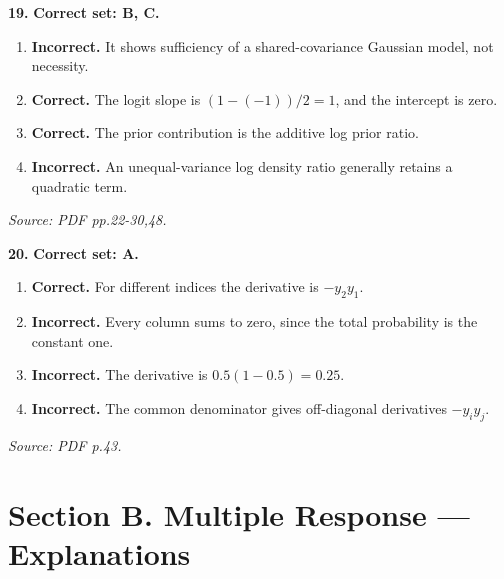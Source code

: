 \documentclass[11pt,a4paper]{article}
\begin{document}
\par\noindent\begin{minipage}{\linewidth}
\textbf{19.} \textbf{Correct set: B, C.}
\begin{enumerate}[label=(\Alph*),leftmargin=8mm,itemsep=2pt,topsep=2pt]
\item \textbf{Incorrect.} It shows sufficiency of a shared-covariance Gaussian model, not necessity.
\item \textbf{Correct.} The logit slope is \((1-(-1))/2=1\), and the intercept is zero.
\item \textbf{Correct.} The prior contribution is the additive log prior ratio.
\item \textbf{Incorrect.} An unequal-variance log density ratio generally retains a quadratic term.
\end{enumerate}
{\footnotesize\textit{Source: PDF pp.22-30,48.}}

\end{minipage}\par\vspace{3mm}
\par\noindent\begin{minipage}{\linewidth}
\textbf{20.} \textbf{Correct set: A.}
\begin{enumerate}[label=(\Alph*),leftmargin=8mm,itemsep=2pt,topsep=2pt]
\item \textbf{Correct.} For different indices the derivative is \(-y_2y_1\).
\item \textbf{Incorrect.} Every column sums to zero, since the total probability is the constant one.
\item \textbf{Incorrect.} The derivative is \(0.5(1-0.5)=0.25\).
\item \textbf{Incorrect.} The common denominator gives off-diagonal derivatives \(-y_i y_j\).
\end{enumerate}
{\footnotesize\textit{Source: PDF p.43.}}

\end{minipage}\par\vspace{3mm}
\newpage\section*{Section B. Multiple Response --- Explanations}
\end{document}
